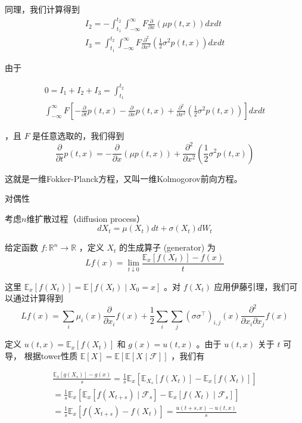 同理，我们计算得到
$$
\begin{gathered}
I_2=-\int_{t_1}^{t_2} \int_{-\infty}^{\infty} F \frac{\partial}{\partial x}(\mu p(t, x)) d x d t \\
I_3=\int_{t_1}^{t_2} \int_{-\infty}^{\infty} F \frac{\partial^2}{\partial x^2}\left(\frac{1}{2} \sigma^2 p(t, x)\right) d x d t
\end{gathered}
$$

由于

$$
\begin{gathered}
0=I_1+I_2+I_3=\int_{t_1}^{t_2} \\
\int_{-\infty}^{\infty} F\left[-\frac{\partial}{\partial t} p(t, x)-\frac{\partial}{\partial x}
p(t, x)+\frac{\partial^2}{\partial x^2}\left(\frac{1}{2} \sigma^2 p(t, x)\right)\right] d x d t
\end{gathered}
$$

，且 $F$ 是任意选取的，我们得到
$$
\frac{\partial}{\partial t} p(t, x)=-\frac{\partial}{\partial x}(\mu p(t, x))+\frac{\partial^2}{\partial x^2}\left(\frac{1}{2} \sigma^2 p(t, x)\right)
$$

这就是一维Fokker-Planck方程，又叫一维Kolmogorov前向方程。

对偶性

考虑$n$维扩散过程（diffusion process）
$$
d X_t=\mu\left(X_t\right) d t+\sigma\left(X_t\right) d W_t
$$

给定函数 $f: \mathbb{R}^n \rightarrow \mathbb{R}$ ，定义 $X_t$ 的生成算子 (generator) 为
$$
L f(x)=\lim _{t \downarrow 0} \frac{\mathbb{E}_x\left[f\left(X_t\right)\right]-f(x)}{t}
$$

这里 $\mathbb{E}_x\left[f\left(X_t\right)\right]=\mathbb{E}\left[f\left(X_t\right) \mid X_0=x\right]$ 。对 $f\left(X_t\right)$
应用伊藤引理，我们可以通过计算得到
$$
L f(x)=\sum_i \mu_i(x) \frac{\partial}{\partial x_i} f(x)+\frac{1}{2} \sum_i \sum_j\left(\sigma \sigma^{\top}\right)_{i, j}(x) \frac{\partial^2}{\partial x_i \partial x_j} f(x)
$$

定义 $u(t, x)=\mathbb{E}_x\left[f\left(X_t\right)\right]$ 和 $g(x)=u(t, x)$ 。由于 $u(t, x)$ 关于 $t$ 可导，
根据tower性质 $\mathbb{E}[X]=\mathbb{E}[\mathbb{E}[X \mid \mathcal{F}]]$ ，我们有

$$
\begin{gathered}
\frac{\mathbb{E}_x\left[g\left(X_s\right)\right]-g(x)}{s}=\frac{1}{s} \mathbb{E}_x\left[\mathbb{E}_{X_s}\left[f\left(X_t\right)\right]-\mathbb{E}_x\left[f\left(X_t\right)\right]\right] \\
=\frac{1}{s} \mathbb{E}_x\left[\mathbb{E}_x\left[f\left(X_{t+s}\right) \mid \mathcal{F}_s\right]-\mathbb{E}_x\left[f\left(X_t\right) \mid \mathcal{F}_s\right]\right] \\
=\frac{1}{s} \mathbb{E}_x\left[f\left(X_{t+s}\right)-f\left(X_t\right)\right]=\frac{u(t+s, x)-u(t, x)}{s}
\end{gathered}
$$


